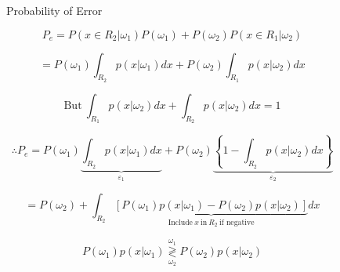 \documentclass[fleqn]{article}
\newcommand{\decisionbound}{\overset{\omega_1}{\underset{\omega_2}{\gtrless}}}
\begin{document}
	\begin{figure}[H]
		\centerline{}
		\caption{Probability of Error}
		\label{prob_error}
	\end{figure}
	
	\begin{equation*}
		P_e = P(x \in R_2 | \omega_1)P(\omega_1) + P(\omega_2)P(x \in R_1 | \omega_2)
	\end{equation*}
	
	\begin{equation*}
		= P(\omega_1)\int_{R_2}{p(x|\omega_1)dx} + P(\omega_2)\int_{R_1}{p(x|\omega_2)dx}
	\end{equation*}
	
	\begin{equation*}
		\text{But}\ \int_{R_1}p(x|\omega_2)dx + \int_{R_2}p(x|\omega_2)dx = 1
	\end{equation*}
	
	\begin{equation*}
		\therefore P_e = P(\omega_1)\underbrace{\int_{R_2}p(x|\omega_1)dx}_{\varepsilon_1} + P(\omega_2)\underbrace{\left\{1 - \int_{R_2}p(x|\omega_2)dx\right\}}_{\varepsilon_2}
	\end{equation*}
	
	\begin{equation*}
		= P(\omega_2) + \int_{R_2}\underbrace{\left[P(\omega_1)p(x|\omega_1) - P(\omega_2)p(x|\omega_2)\right]}_{\text{Include}\ x\ \text{in}\ R_2\ \text{if negative}}dx
	\end{equation*}
	
	\begin{equation*}
		P(\omega_1)p(x|\omega_1) \decisionbound P(\omega_2)p(x|\omega_2)
	\end{equation*}
	
\end{document}

